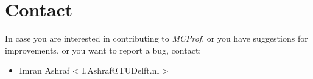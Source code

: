 \documentclass[11pt]{article}
\newcommand{\MCPROF}{\emph{MCProf}}
\begin{document}
\section{Contact}
\label{sec:contact}

In case you are interested in contributing to \MCPROF{}, or you have suggestions for
improvements, or you want to report a bug, contact:

\begin{itemize}
\item Imran Ashraf < I.Ashraf@TUDelft.nl >
\end{itemize}




\end{document}
